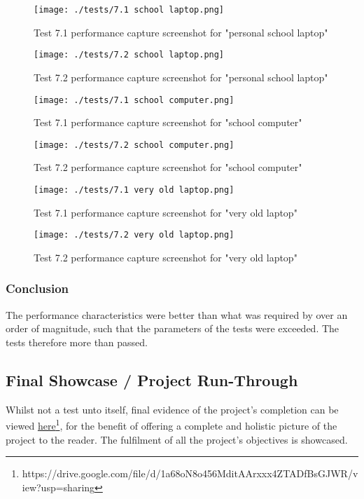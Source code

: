 \begin{figure}[H]
	\centering
	\texttt{[image: ./tests/7.1 school laptop.png]}
	\caption{Test 7.1 performance capture screenshot for "personal school laptop"}
\end{figure}
\begin{figure}[H]
	\centering
	\texttt{[image: ./tests/7.2 school laptop.png]}
	\caption{Test 7.2 performance capture screenshot for "personal school laptop"}
\end{figure}
\begin{figure}[H]
	\centering
	\texttt{[image: ./tests/7.1 school computer.png]}
	\caption{Test 7.1 performance capture screenshot for "school computer"}
\end{figure}
\begin{figure}[H]
	\centering
	\texttt{[image: ./tests/7.2 school computer.png]}
	\caption{Test 7.2 performance capture screenshot for "school computer"}
\end{figure}
\begin{figure}[H]
	\centering
	\texttt{[image: ./tests/7.1 very old laptop.png]}
	\caption{Test 7.1 performance capture screenshot for "very old laptop"}
\end{figure}
\begin{figure}[H]
	\centering
	\texttt{[image: ./tests/7.2 very old laptop.png]}
	\caption{Test 7.2 performance capture screenshot for "very old laptop"}
\end{figure}


\subsubsection*{Conclusion}
The performance characteristics were better than what was required by over an order of magnitude, such that the parameters of the tests were exceeded. The tests therefore more than passed.


\pagebreak
\subsection{Final Showcase / Project Run-Through}
Whilst not a test unto itself, final evidence of the project's completion can be viewed
\href{https://drive.google.com/file/d/1a68oN8o456MditAArxxx4ZTADfBsGJWR/view?usp=sharing}{here}\footnote{
	https://drive.google.com/file/d/1a68oN8o456MditAArxxx4ZTADfBsGJWR/view?usp=sharing
}, for the benefit of offering a complete and holistic picture of the project to the reader. The fulfilment  of all the project's objectives is showcased. 